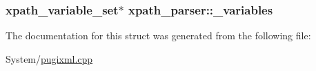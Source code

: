 \hypertarget{structxpath__parser_a3e0adfea7cc81c08b97ee1375831df6c}{
\subsubsection[{\-\_\-variables}]{\setlength{\rightskip}{0pt plus 5cm}xpath\-\_\-variable\-\_\-set$\ast$ xpath\-\_\-parser\-::\-\_\-variables}}\label{structxpath__parser_a3e0adfea7cc81c08b97ee1375831df6c}


The documentation for this struct was generated from the following file\-:\begin{DoxyCompactItemize}
\item 
System/\hyperlink{pugixml_8cpp}{pugixml.\-cpp}\end{DoxyCompactItemize}
